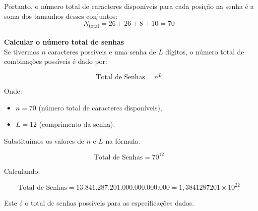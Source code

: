 Portanto, o número total de caracteres disponíveis para cada posição na senha é a soma dos tamanhos desses conjuntos:\\

\[
N_{\text{total}} = 26 + 26 + 8 + 10 = 70
\]\\

\textbf{Calcular o número total de senhas}\\

Se tivermos \( n \) caracteres possíveis e uma senha de \( L \) dígitos, o número total de combinações possíveis é dado por:

\[
\text{Total de Senhas} = n^L
\]

Onde:
\begin{itemize}
    \item \( n = 70 \) (número total de caracteres disponíveis),
    \item \( L = 12 \) (comprimento da senha).
\end{itemize}

Substituímos os valores de \( n \) e \( L \) na fórmula:

\[
\text{Total de Senhas} = 70^{12}
\]

Calculando:

\[
\text{Total de Senhas} = 13.841.287.201.000.000.000.000 = 1,3841287201 \times 10^{22}
\]

Este é o total de senhas possíveis para as especificações dadas.

\pagebreak

